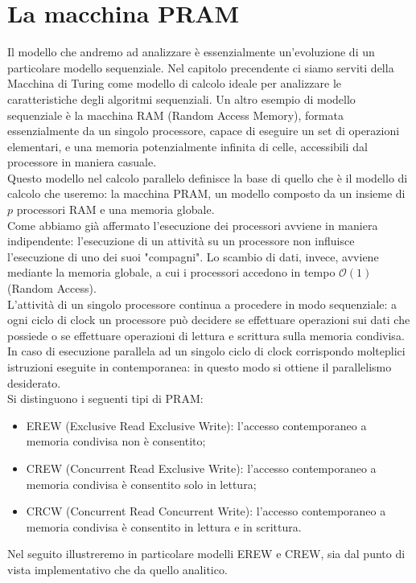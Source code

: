\section{La macchina PRAM}
Il modello che andremo ad analizzare è essenzialmente un'evoluzione di un particolare modello sequenziale. Nel capitolo precendente ci siamo serviti della Macchina di Turing come modello di calcolo ideale per analizzare le caratteristiche degli algoritmi sequenziali. Un altro esempio di modello sequenziale è la macchina RAM (Random Access Memory), formata essenzialmente da un singolo processore, capace di eseguire un set di operazioni elementari, e una memoria potenzialmente infinita di celle, accessibili dal processore in maniera casuale.\\
Questo modello nel calcolo parallelo definisce la base di quello che è il modello di calcolo che useremo: la macchina PRAM, un modello composto da un insieme di $p$ processori RAM e una memoria globale.\\
Come abbiamo già affermato l'esecuzione dei processori avviene in maniera indipendente: l'esecuzione di un attività su un processore non influisce l'esecuzione di uno dei suoi "compagni". Lo scambio di dati, invece, avviene mediante la memoria globale, a cui i processori accedono in tempo $\mathcal {O}(1)$ (Random Access).\\
\newpage
\noindent L'attività di un singolo processore continua a procedere in modo sequenziale: a ogni ciclo di clock un processore può decidere se effettuare operazioni sui dati che possiede o se effettuare operazioni di lettura e scrittura sulla memoria condivisa. In caso di esecuzione parallela ad un singolo ciclo di clock corrispondo molteplici istruzioni eseguite in contemporanea: in questo modo si ottiene il parallelismo desiderato.\\
Si distinguono i seguenti tipi di PRAM:
\begin{itemize}
\item{EREW (Exclusive Read Exclusive Write): l'accesso contemporaneo a memoria condivisa non è consentito;}
\item{CREW (Concurrent Read Exclusive Write): l'accesso contemporaneo a memoria condivisa è consentito solo in lettura;}
\item{CRCW (Concurrent Read Concurrent Write): l'accesso contemporaneo a memoria condivisa è consentito in lettura e in scrittura.}
\end{itemize}
Nel seguito illustreremo in particolare modelli EREW e CREW, sia dal punto di vista implementativo che da quello analitico.\\
